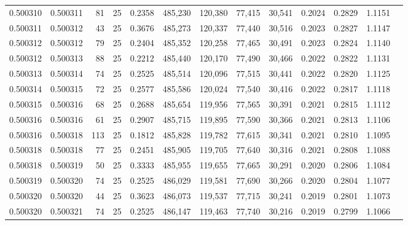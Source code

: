 \begin{tabular}{rrrrrrrrrrrrr}
0.500310 & 0.500311 &  81 &  25 &                                     0.2358 & 485,230 & 120,380 &  77,415 &  30,541 & 0.2024 & 0.2829 & 1.1151 \\
0.500311 & 0.500312 &  43 &  25 &                                     0.3676 & 485,273 & 120,337 &  77,440 &  30,516 & 0.2023 & 0.2827 & 1.1147 \\
0.500312 & 0.500312 &  79 &  25 &                                     0.2404 & 485,352 & 120,258 &  77,465 &  30,491 & 0.2023 & 0.2824 & 1.1140 \\
0.500312 & 0.500313 &  88 &  25 &                                     0.2212 & 485,440 & 120,170 &  77,490 &  30,466 & 0.2022 & 0.2822 & 1.1131 \\
0.500313 & 0.500314 &  74 &  25 &                                     0.2525 & 485,514 & 120,096 &  77,515 &  30,441 & 0.2022 & 0.2820 & 1.1125 \\
0.500314 & 0.500315 &  72 &  25 &                                     0.2577 & 485,586 & 120,024 &  77,540 &  30,416 & 0.2022 & 0.2817 & 1.1118 \\
0.500315 & 0.500316 &  68 &  25 &                                     0.2688 & 485,654 & 119,956 &  77,565 &  30,391 & 0.2021 & 0.2815 & 1.1112 \\
0.500316 & 0.500316 &  61 &  25 &                                     0.2907 & 485,715 & 119,895 &  77,590 &  30,366 & 0.2021 & 0.2813 & 1.1106 \\
0.500316 & 0.500318 & 113 &  25 &                                     0.1812 & 485,828 & 119,782 &  77,615 &  30,341 & 0.2021 & 0.2810 & 1.1095 \\
0.500318 & 0.500318 &  77 &  25 &                                     0.2451 & 485,905 & 119,705 &  77,640 &  30,316 & 0.2021 & 0.2808 & 1.1088 \\
0.500318 & 0.500319 &  50 &  25 &                                     0.3333 & 485,955 & 119,655 &  77,665 &  30,291 & 0.2020 & 0.2806 & 1.1084 \\
0.500319 & 0.500320 &  74 &  25 &                                     0.2525 & 486,029 & 119,581 &  77,690 &  30,266 & 0.2020 & 0.2804 & 1.1077 \\
0.500320 & 0.500320 &  44 &  25 &                                     0.3623 & 486,073 & 119,537 &  77,715 &  30,241 & 0.2019 & 0.2801 & 1.1073 \\
0.500320 & 0.500321 &  74 &  25 &                                     0.2525 & 486,147 & 119,463 &  77,740 &  30,216 & 0.2019 & 0.2799 & 1.1066 \\

\end{tabular}
